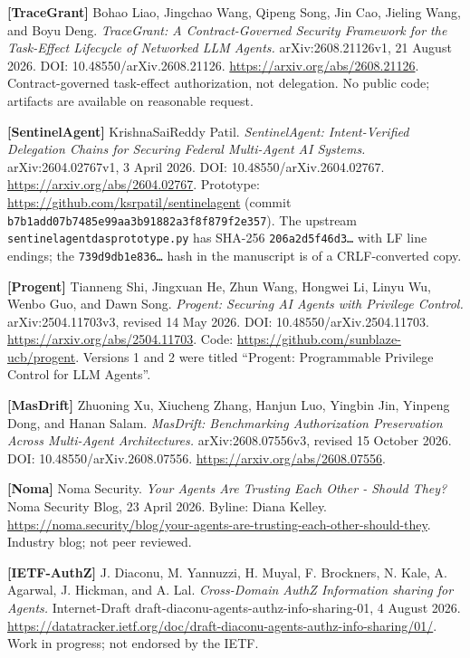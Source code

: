 \documentclass[
  10pt,
]{article}
\let\origtexttt\texttt
\renewcommand{\texttt}[1]{{\upshape\origtexttt{#1}}}
\renewcommand{\_}{\allowbreak\origunderscore}
\begin{document}
\textbf{{[}TraceGrant{]}} Bohao Liao, Jingchao Wang, Qipeng Song, Jin
Cao, Jieling Wang, and Boyu Deng. \emph{TraceGrant: A Contract-Governed
Security Framework for the Task-Effect Lifecycle of Networked LLM
Agents.} arXiv:2608.21126v1, 21 August 2026. DOI:
10.48550/arXiv.2608.21126. \url{https://arxiv.org/abs/2608.21126}.
Contract-governed task-effect authorization, not delegation. No public
code; artifacts are available on reasonable request.

\textbf{{[}SentinelAgent{]}} KrishnaSaiReddy Patil. \emph{SentinelAgent:
Intent-Verified Delegation Chains for Securing Federal Multi-Agent AI
Systems.} arXiv:2604.02767v1, 3 April 2026. DOI:
10.48550/arXiv.2604.02767. \url{https://arxiv.org/abs/2604.02767}.
Prototype: \url{https://github.com/ksrpatil/sentinelagent} (commit
\texttt{b7b1add07b7485e99aa3b91882a3f8f879f2e357}). The upstream
\texttt{sentinelagent\_das\_prototype.py} has SHA-256
\texttt{206a2d5f46d3…} with LF line endings; the \texttt{739d9db1e836…}
hash in the manuscript is of a CRLF-converted copy.

\textbf{{[}Progent{]}} Tianneng Shi, Jingxuan He, Zhun Wang, Hongwei Li,
Linyu Wu, Wenbo Guo, and Dawn Song. \emph{Progent: Securing AI Agents
with Privilege Control.} arXiv:2504.11703v3, revised 14 May 2026. DOI:
10.48550/arXiv.2504.11703. \url{https://arxiv.org/abs/2504.11703}. Code:
\url{https://github.com/sunblaze-ucb/progent}. Versions 1 and 2 were
titled ``Progent: Programmable Privilege Control for LLM Agents''.

\textbf{{[}MasDrift{]}} Zhuoning Xu, Xiucheng Zhang, Hanjun Luo, Yingbin
Jin, Yinpeng Dong, and Hanan Salam. \emph{MasDrift: Benchmarking
Authorization Preservation Across Multi-Agent Architectures.}
arXiv:2608.07556v3, revised 15 October 2026. DOI:
10.48550/arXiv.2608.07556. \url{https://arxiv.org/abs/2608.07556}.

\textbf{{[}Noma{]}} Noma Security. \emph{Your Agents Are Trusting Each
Other - Should They?} Noma Security Blog, 23 April 2026. Byline: Diana
Kelley.
\url{https://noma.security/blog/your-agents-are-trusting-each-other-should-they}.
Industry blog; not peer reviewed.

\textbf{{[}IETF-AuthZ{]}} J. Diaconu, M. Yannuzzi, H. Muyal, F.
Brockners, N. Kale, A. Agarwal, J. Hickman, and A. Lal.
\emph{Cross-Domain AuthZ Information sharing for Agents.} Internet-Draft
draft-diaconu-agents-authz-info-sharing-01, 4 August 2026.
\url{https://datatracker.ietf.org/doc/draft-diaconu-agents-authz-info-sharing/01/}.
Work in progress; not endorsed by the IETF.
\end{document}
